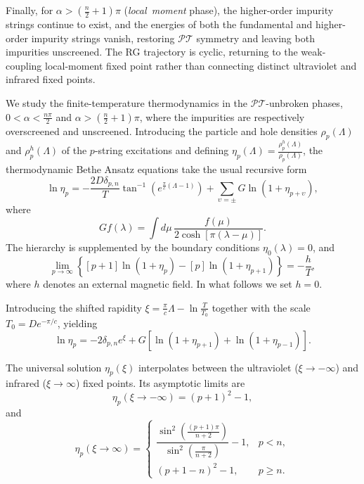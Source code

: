 \documentclass[aps,  prb,twocolumn,
  superscriptaddress,  floatfix,  10pt         
]{revtex4-2}
\begin{document}
Finally, for $\alpha>\left(\frac{n}{2}+1\right)\pi$ ({\em{local\ moment}} phase), the higher-order impurity strings continue to exist, and the energies of both the fundamental and higher-order impurity strings vanish, restoring
$\mathscr{PT}$ symmetry and leaving both impurities unscreened. The RG trajectory is cyclic, returning to the weak-coupling local-moment fixed point rather than connecting distinct ultraviolet and infrared fixed points. 

We study the finite-temperature thermodynamics in the $\mathscr{PT}$-unbroken phases, $0<\alpha<\frac{n\pi}{2}$ and $\alpha>\left(\frac{n}{2}+1\right)\pi$, where the impurities are respectively overscreened and unscreened. Introducing the particle and hole densities $\rho_p(\Lambda)$ and $\rho_p^h(\Lambda)$ of the $p$-string excitations and defining $\eta_p(\Lambda)=\frac{\rho_p^h(\Lambda)}{\rho_p(\Lambda)}$, the thermodynamic Bethe Ansatz equations take the usual recursive form
\begin{equation}
\ln\eta_p = - \frac{2D \delta_{p,n}}{T} \tan^{-1} \left(e^{\frac{\pi}{c}(\Lambda-1)}\right) + \sum_{\upsilon=\pm}G \ln(1+\eta_{p+\upsilon}),
\end{equation}
where
\begin{equation}
Gf(\lambda)=\int d\mu\,\frac{f(\mu)} {2\cosh\!\left[\pi(\lambda-\mu)\right]}.
\end{equation}
The hierarchy is supplemented by the boundary conditions $\eta_0(\lambda)=0$, and
\begin{equation}
\lim_{p\to\infty}\left\{[p+1]\ln\left(1+\eta_p\right)-[p]\ln\left(1+ \eta_{p+1}\right)\right\}=-\frac{h}{T},
\end{equation}
where $h$ denotes an external magnetic field. In what follows we set $h=0$.


Introducing the shifted rapidity
$\xi=\frac{\pi}{c}\Lambda-\ln\frac{T}{T_0}$ together with the scale
$T_0=De^{-\pi/c}$, yielding
\begin{equation}
\ln\eta_p
=
-2\delta_{p,n}e^\xi
+
G\left[
\ln(1+\eta_{p+1})
+
\ln(1+\eta_{p-1})
\right].
\end{equation}

The universal solution $\eta_p(\xi)$ interpolates between the ultraviolet ($\xi\to -\infty$) and infrared ($\xi\to \infty$) fixed points. Its asymptotic limits are
\begin{equation}
\eta_p(\xi\to -\infty)=(p+1)^2-1,\label{UV-limit}
\end{equation}
and
\begin{equation}
\eta_p(\xi\to\infty)=
\begin{cases}
\dfrac{\sin^2\left(\frac{(p+1)\pi}{n+2}\right)}
{\sin^2\left(\frac{\pi}{n+2}\right)}-1,& p<n,\\
(p+1-n)^2-1,& p\ge n.
\end{cases}
\label{IRlimit}
\end{equation}
\end{document}
